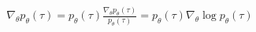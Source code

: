 \begin{align}
\nabla_\theta p_\theta(\tau) = p_\theta(\tau) \frac{\nabla_\theta p_\theta(\tau)}{p_\theta(\tau)} = p_\theta(\tau) \nabla_\theta \log p_\theta(\tau)
\end{align}